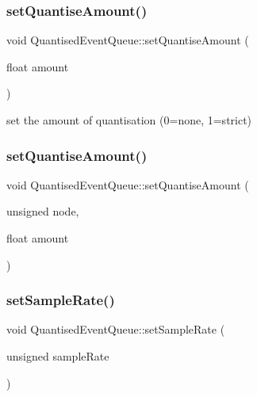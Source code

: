 \subsubsection{\texorpdfstring{set\+Quantise\+Amount()}{setQuantiseAmount()}\hspace{0.1cm}{\footnotesize\ttfamily [1/2]}}
{\footnotesize\ttfamily void Quantised\+Event\+Queue\+::set\+Quantise\+Amount (\begin{DoxyParamCaption}\item[{float}]{amount }\end{DoxyParamCaption})}



set the amount of quantisation (0=none, 1=strict) 

\mbox{\label{classQuantisedEventQueue_aee5e2fa3c8fe5cf7ab23d2da94c97fb2}} 
\subsubsection{\texorpdfstring{set\+Quantise\+Amount()}{setQuantiseAmount()}\hspace{0.1cm}{\footnotesize\ttfamily [2/2]}}
{\footnotesize\ttfamily void Quantised\+Event\+Queue\+::set\+Quantise\+Amount (\begin{DoxyParamCaption}\item[{unsigned}]{node,  }\item[{float}]{amount }\end{DoxyParamCaption})}

\mbox{\label{classQuantisedEventQueue_a8a228847e9840052560ad27b7c48988d}} 
\subsubsection{\texorpdfstring{set\+Sample\+Rate()}{setSampleRate()}}
{\footnotesize\ttfamily void Quantised\+Event\+Queue\+::set\+Sample\+Rate (\begin{DoxyParamCaption}\item[{unsigned}]{sample\+Rate }\end{DoxyParamCaption})}



